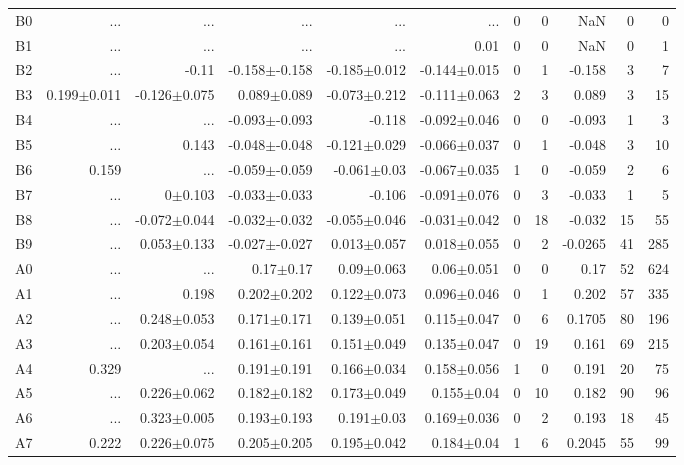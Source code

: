 \begin{table}[t]
\begin{table}[t]
\begin{center}
\begin{tabular}{c|rrrrr|rrrrr}
    B0	&	 ...	&	 ...	&	 ...	&	 ...	&	 ...	&	0	&	0	&	NaN	&	0	&	0	\\
    B1	&	 ...	&	 ...	&	 ...	&	 ...	&	0.01	&	0	&	0	&	NaN	&	0	&	1	\\
    B2	&	 ...	&	-0.11	&	-0.158$\pm$-0.158	&	-0.185$\pm$0.012	&	-0.144$\pm$0.015	&	0	&	1	&	-0.158	&	3	&	7	\\
    B3	&	0.199$\pm$0.011	&	-0.126$\pm$0.075	&	0.089$\pm$0.089	&	-0.073$\pm$0.212	&	-0.111$\pm$0.063	&	2	&	3	&	0.089	&	3	&	15	\\
    B4	&	 ...	&	 ...	&	-0.093$\pm$-0.093	&	-0.118	&	-0.092$\pm$0.046	&	0	&	0	&	-0.093	&	1	&	3	\\
    B5	&	 ...	&	0.143	&	-0.048$\pm$-0.048	&	-0.121$\pm$0.029	&	-0.066$\pm$0.037	&	0	&	1	&	-0.048	&	3	&	10	\\
    B6	&	0.159	&	 ...	&	-0.059$\pm$-0.059	&	-0.061$\pm$0.03	&	-0.067$\pm$0.035	&	1	&	0	&	-0.059	&	2	&	6	\\
    B7	&	 ...	&	0$\pm$0.103	&	-0.033$\pm$-0.033	&	-0.106	&	-0.091$\pm$0.076	&	0	&	3	&	-0.033	&	1	&	5	\\
    B8	&	 ...	&	-0.072$\pm$0.044	&	-0.032$\pm$-0.032	&	-0.055$\pm$0.046	&	-0.031$\pm$0.042	&	0	&	18	&	-0.032	&	15	&	55	\\
    B9	&	 ...	&	0.053$\pm$0.133	&	-0.027$\pm$-0.027	&	0.013$\pm$0.057	&	0.018$\pm$0.055	&	0	&	2	&	-0.0265	&	41	&	285	\\
    A0	&	 ...	&	 ...	&	0.17$\pm$0.17	&	0.09$\pm$0.063	&	0.06$\pm$0.051	&	0	&	0	&	0.17	&	52	&	624	\\
    A1	&	 ...	&	0.198	&	0.202$\pm$0.202	&	0.122$\pm$0.073	&	0.096$\pm$0.046	&	0	&	1	&	0.202	&	57	&	335	\\
    A2	&	 ...	&	0.248$\pm$0.053	&	0.171$\pm$0.171	&	0.139$\pm$0.051	&	0.115$\pm$0.047	&	0	&	6	&	0.1705	&	80	&	196	\\
    A3	&	 ...	&	0.203$\pm$0.054	&	0.161$\pm$0.161	&	0.151$\pm$0.049	&	0.135$\pm$0.047	&	0	&	19	&	0.161	&	69	&	215	\\
    A4	&	0.329	&	 ...	&	0.191$\pm$0.191	&	0.166$\pm$0.034	&	0.158$\pm$0.056	&	1	&	0	&	0.191	&	20	&	75	\\
    A5	&	 ...	&	0.226$\pm$0.062	&	0.182$\pm$0.182	&	0.173$\pm$0.049	&	0.155$\pm$0.04	&	0	&	10	&	0.182	&	90	&	96	\\
    A6	&	 ...	&	0.323$\pm$0.005	&	0.193$\pm$0.193	&	0.191$\pm$0.03	&	0.169$\pm$0.036	&	0	&	2	&	0.193	&	18	&	45	\\
    A7	&	0.222	&	0.226$\pm$0.075	&	0.205$\pm$0.205	&	0.195$\pm$0.042	&	0.184$\pm$0.04	&	1	&	6	&	0.2045	&	55	&	99	\\

\end{tabular}
\end{center}
\end{table}
\end{table}
